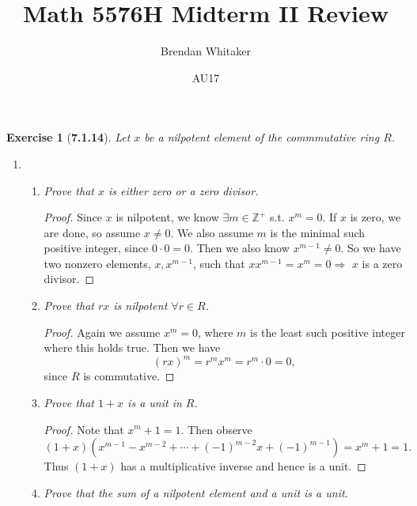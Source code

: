 \documentclass[10pt,oneside,reqno]{amsart}
\theoremstyle{plain}
\newtheorem*{e}{Exercise}
\theoremstyle{definition}
\begin{document}
\title{Math 5576H Midterm II Review}

\date{AU17}

\author[Brendan Whitaker]{Brendan Whitaker}

\maketitle

\begin{e}[\textbf{7.1.14}]
Let $x$ be a nilpotent element of the commmutative ring $R$. 
\end{e}
\begin{enumerate}
\item[]
\begin{enumerate}
\item \textit{Prove that $x$ is either zero or a zero divisor. }
\begin{proof}
\vspace{3mm}
Since $x$ is nilpotent, we know $\exists m \in \mathbb{Z}^+$ s.t. $x^m = 0$. If $x$ is zero, we are done, so assume $x \neq 0$. We also assume $m$ is the minimal such positive integer, since $0 \cdot 0 = 0$. Then we also know $x^{m - 1} \neq 0$. So we have two nonzero elements, $x,x^{m - 1}$, such that $xx^{m - 1} = x^{m} = 0 \Rightarrow$ $x$ is a zero divisor. 
\end{proof}
\vspace{3mm}
\item 
\textit{Prove that $rx$ is nilpotent $\forall r \in R$. }

\begin{proof}
\vspace{3mm}
Again we assume $x^m = 0$, where $m$ is the least such positive integer where this holds true. Then we have
\[(rx)^m = r^mx^m = r^m \cdot 0 = 0,\]
since $R$ is commutative. 
\end{proof}
\vspace{3mm}
\item \textit{Prove that $1+ x$ is a unit in $R$. }
\begin{proof}
\vspace{3mm}
Note that $x^m + 1 = 1$. Then observe \[(1 + x)(x^{m - 1} - x^{m - 2} + \cdots + (-1)^{m - 2}x + (-1)^{m - 1}) = x^m + 1 = 1.\]
Thus $(1 + x)$ has a multiplicative inverse and hence is a unit. 
\end{proof}
\vspace{3mm}
\item \textit{Prove that the sum of a nilpotent element and a unit is a unit. }


\end{enumerate}
\end{enumerate}
\end{document}
